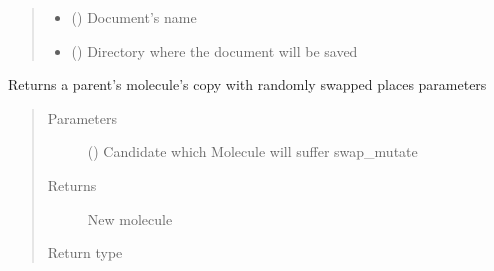 \documentclass[letterpaper,10pt,english]{sphinxmanual}
\begin{document}
\begin{fulllineitems}
\begin{fulllineitems}
\begin{quote}
\begin{description}
\begin{itemize}
\item {} 
\sphinxAtStartPar
{} () \textendash{} Document’s name

\item {} 
\sphinxAtStartPar
{} () \textendash{} Directory where the document will be saved

\end{itemize}

\end{description}\end{quote}

\end{fulllineitems}


\begin{fulllineitems}
\label{\detokenize{MolOpt:MolOpt.MolOpt.MolOpt.swap_mutate}}
\sphinxAtStartPar
Returns a parent’s molecule’s copy with randomly swapped places parameters
\begin{quote}\begin{description}
\item[{Parameters}] \leavevmode
\sphinxAtStartPar
{} ({\hyperref[\detokenize{MolOpt.genetic:MolOpt.genetic.genetic.Chromosome}]{}}) \textendash{} Candidate which Molecule will suffer swap\_mutate

\item[{Returns}] \leavevmode
\sphinxAtStartPar
New molecule

\item[{Return type}] \leavevmode
\sphinxAtStartPar
{\hyperref[\detokenize{MolOpt.molecular:MolOpt.molecular.molecular.Molecule}]{}}

\end{description}\end{quote}

\end{fulllineitems}


\end{fulllineitems}
\end{document}
